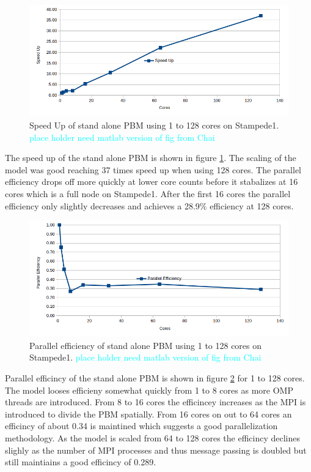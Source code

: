\begin{figure}[H]
\centering
\includegraphics[scale=0.5]{fig_rslts_sa_pbm_speed_up.png}
\caption{Speed Up of stand alone PBM using 1 to 128 cores on Stampede1. \textcolor{cyan}{place holder need matlab version of fig from Chai} }
\label{fig:rslts_sa_pbm_speedup}
\end{figure}

The speed up of the stand alone PBM  is shown in figure \ref{fig:rslts_sa_pbm_speedup}. The scaling of the model was good reaching 37 times speed up when using 128 cores. The parallel efficiency drops off more quickly at lower core counts before it stabalizes at 16 cores which is a full node on Stampede1. After the first 16 cores the parallel efficiency only slightly decreases and achieves a 28.9$\%$ efficiency at 128 cores.


\begin{figure}[H]
\begin{center}
\includegraphics[scale=0.5]{fig_rslts_sa_pbm_parallel_efficiency.png}
\caption{Parallel efficiency of stand alone PBM using 1 to 128 cores on Stampede1. \textcolor{cyan}{place holder need matlab version of fig from Chai} }
\label{fig:rslts_sa_pbm_pll_effic}
\end{center}
\end{figure}

Parallel efficincy of the stand alone PBM is shown in figure \ref{fig:rslts_sa_pbm_pll_effic} for 1 to 128 cores. The model looses efficieny somewhat quickly from 1 to 8 cores as more OMP threads are introduced. From 8 to 16 cores the efficincey increases as the MPI is introduced to divide the PBM spatially. From 16 cores on out to 64 cores an efficincy of about 0.34 is maintined which suggests a good parallelization methodology. As the model is scaled from 64 to 128 cores the efficincy declines slighly as the number of MPI processes and thus message passing is doubled but still maintiains a good efficincy of 0.289.  


